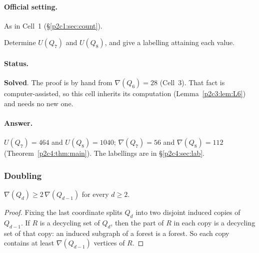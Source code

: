 
\paragraph{Official setting.} As in Cell~1 (\S\ref{p2c1:sec:count}).

\begin{statement}
Determine $U(Q_7)$ and $U(Q_8)$, and give a labelling attaining each value.
\end{statement}

\paragraph{Status.} \textbf{Solved}. The proof is by hand from $\nabla(Q_6)=28$ (Cell~3). That
fact is computer-assisted, so this cell inherits its computation (Lemma~\ref{p2c3:lem:L6}) and
needs no new one.

\paragraph{Answer.} $U(Q_7)=464$ and $U(Q_8)=1040$; $\nabla(Q_7)=56$ and $\nabla(Q_8)=112$
(Theorem~\ref{p2c4:thm:main}). The labellings are in \S\ref{p2c4:sec:lab}.

\subsubsection{Doubling}

\begin{lemma}[Doubling]\label{p2c4:lem:double}
$\nabla(Q_d)\ge2\,\nabla(Q_{d-1})$ for every $d\ge2$.
\end{lemma}

\begin{proof}
Fixing the last coordinate splits $Q_d$ into two disjoint induced copies of $Q_{d-1}$. If $R$ is a
decycling set of $Q_d$, then the part of $R$ in each copy is a decycling set of that copy: an
induced subgraph of a forest is a forest. So each copy contains at least $\nabla(Q_{d-1})$
vertices of $R$.
\end{proof}

